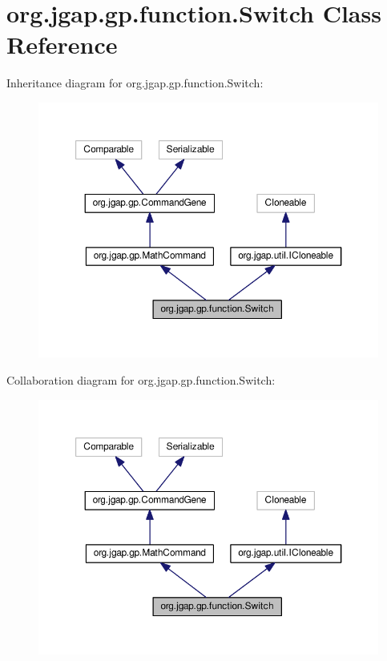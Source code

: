 \hypertarget{classorg_1_1jgap_1_1gp_1_1function_1_1_switch}{\section{org.\-jgap.\-gp.\-function.\-Switch Class Reference}
\label{classorg_1_1jgap_1_1gp_1_1function_1_1_switch}
}


Inheritance diagram for org.\-jgap.\-gp.\-function.\-Switch\-:
\nopagebreak
\begin{figure}[H]
\begin{center}
\leavevmode
\includegraphics[width=350pt]{classorg_1_1jgap_1_1gp_1_1function_1_1_switch__inherit__graph}
\end{center}
\end{figure}


Collaboration diagram for org.\-jgap.\-gp.\-function.\-Switch\-:
\nopagebreak
\begin{figure}[H]
\begin{center}
\leavevmode
\includegraphics[width=350pt]{classorg_1_1jgap_1_1gp_1_1function_1_1_switch__coll__graph}
\end{center}
\end{figure}
